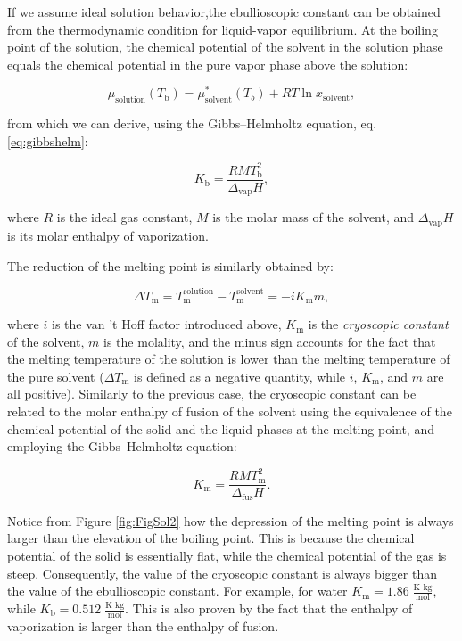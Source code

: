 \documentclass[
  9pt,
]{extbook}
\theoremstyle{definition}
\theoremstyle{definition}
\theoremstyle{definition}
\theoremstyle{definition}
\theoremstyle{remark}
\begin{document}
If we assume ideal solution behavior,the ebullioscopic constant can be obtained from the thermodynamic condition for liquid-vapor equilibrium. At the boiling point of the solution, the chemical potential of the solvent in the solution phase equals the chemical potential in the pure vapor phase above the solution:

\begin{equation}
\mu_{\text{solution}} (T_{\text{b}})  = \mu_{\text{solvent}}^*(T_b)  + RT\ln x_{\text{solvent}},
\label{eq:coll4}
\end{equation}

from which we can derive, using the Gibbs--Helmholtz equation, eq. \eqref{eq:gibbshelm}:

\begin{equation}
K_{\text{b}}=\frac{RMT_{\text{b}}^{2}}{\Delta_{\mathrm{vap}} H},
\label{eq:coll5}
\end{equation}

where \(R\) is the ideal gas constant, \(M\) is the molar mass of the solvent, and \(\Delta_{\mathrm{vap}} H\) is its molar enthalpy of vaporization.

The reduction of the melting point is similarly obtained by:

\begin{equation}
\Delta T_{\text{m}}=T_{\text{m}}^{\text{solution}}-T_{\text{m}}^{\text{solvent}}=-iK_{\text{m}}m,
\label{eq:coll6}
\end{equation}

where \(i\) is the van 't Hoff factor introduced above, \(K_{\text{m}}\) is the \emph{cryoscopic constant} of the solvent, \(m\) is the molality, and the minus sign accounts for the fact that the melting temperature of the solution is lower than the melting temperature of the pure solvent (\(\Delta T_{\text{m}}\) is defined as a negative quantity, while \(i\), \(K_{\text{m}}\), and \(m\) are all positive). Similarly to the previous case, the cryoscopic constant can be related to the molar enthalpy of fusion of the solvent using the equivalence of the chemical potential of the solid and the liquid phases at the melting point, and employing the Gibbs--Helmholtz equation:

\begin{equation}
K_{\text{m}}=\frac{RMT_{\text{m}}^{2}}{\Delta_{\mathrm{fus}}H}.
\label{eq:coll7}
\end{equation}

Notice from Figure \ref{fig:FigSol2} how the depression of the melting point is always larger than the elevation of the boiling point. This is because the chemical potential of the solid is essentially flat, while the chemical potential of the gas is steep. Consequently, the value of the cryoscopic constant is always bigger than the value of the ebullioscopic constant. For example, for water \(K_{\text{m}} = 1.86\; \frac{\text{K kg}}{\text{mol}}\), while \(K_{\text{b}} = 0.512\; \frac{\text{K kg}}{\text{mol}}\). This is also proven by the fact that the enthalpy of vaporization is larger than the enthalpy of fusion.
\end{document}
